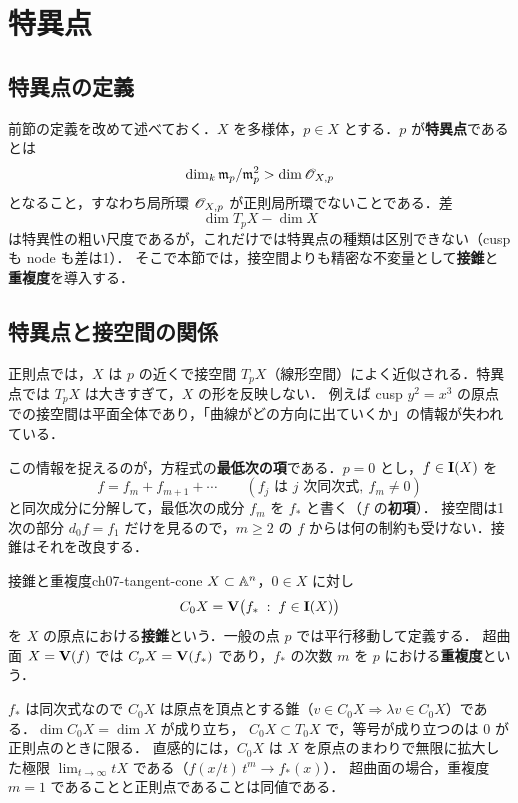 \section{特異点}

\subsection{特異点の定義}

前節の定義を改めて述べておく．$X$ を多様体，$p\in X$ とする．$p$ が\textbf{特異点}であるとは
\[
  \dim_k\mathfrak{m}_p/\mathfrak{m}_p^2>\dim\mathscr{O}_{X,p}
\]
となること，すなわち局所環 $\mathscr{O}_{X,p}$ が正則局所環でないことである．差
\[
  \dim T_pX-\dim X
\]
は特異性の粗い尺度であるが，これだけでは特異点の種類は区別できない（cusp も node も差は1）．
そこで本節では，接空間よりも精密な不変量として\textbf{接錐}と\textbf{重複度}を導入する．

\subsection{特異点と接空間の関係}

正則点では，$X$ は $p$ の近くで接空間 $T_pX$（線形空間）によく近似される．特異点では $T_pX$ は大きすぎて，$X$ の形を反映しない．
例えば cusp $y^2=x^3$ の原点での接空間は平面全体であり，「曲線がどの方向に出ていくか」の情報が失われている．

この情報を捉えるのが，方程式の\textbf{最低次の項}である．$p=0$ とし，$f\in\mathbf{I}(X)$ を
\[
  f=f_m+f_{m+1}+\cdots\qquad(f_j\text{ は }j\text{ 次同次式},\ f_m\neq0)
\]
と同次成分に分解して，最低次の成分 $f_m$ を $f_*$ と書く（$f$ の\textbf{初項}）．
接空間は1次の部分 $d_0f=f_1$ だけを見るので，$m\ge2$ の $f$ からは何の制約も受けない．接錐はそれを改良する．

\begin{mydef}{接錐と重複度}{ch07-tangent-cone}
$X\subset\mathbb{A}^n$，$0\in X$ に対し
\[
  C_0X=\mathbf{V}\bigl(f_*\;:\;f\in\mathbf{I}(X)\bigr)
\]
を $X$ の原点における\textbf{接錐}という．一般の点 $p$ では平行移動して定義する．
超曲面 $X=\mathbf{V}(f)$ では $C_pX=\mathbf{V}(f_*)$ であり，$f_*$ の次数 $m$ を $p$ における\textbf{重複度}という．
\end{mydef}

$f_*$ は同次式なので $C_0X$ は原点を頂点とする錐（$v\in C_0X\Rightarrow\lambda v\in C_0X$）である．$\dim C_0X=\dim X$ が成り立ち，
$C_0X\subset T_0X$ で，等号が成り立つのは $0$ が正則点のときに限る．
直感的には，$C_0X$ は $X$ を原点のまわりで無限に拡大した極限 $\lim_{t\to\infty}tX$ である（$f(x/t)\,t^m\to f_*(x)$）．
超曲面の場合，重複度 $m=1$ であることと正則点であることは同値である．

